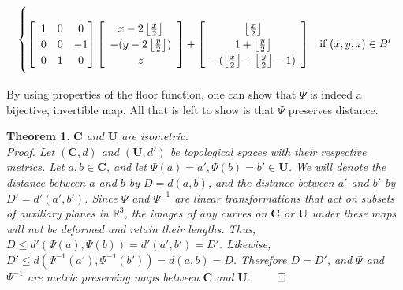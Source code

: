 \documentclass[]{article}
\newtheorem{thm}{Theorem}[subsection]
\begin{document}
\begin{equation}
\begin{cases}
	\\
	
		\left[ \hspace{2mm} \begin{matrix}
			1 & 0 & 0 \\
			0 & 0 & -1 \\
			0 & 1 & 0
		\end{matrix}\hspace{0mm}\right]
	
		\left[\begin{array}{c}
		x - 2\left\lfloor \frac{x}{2} \right\rfloor
		\\ -(y- 2\left\lfloor \frac{y}{2} \right\rfloor)
		\\ z
		\end{array} \right]
		+
		\left[\begin{array}{c}
			\left\lfloor \frac{x}{2} \right\rfloor
			\\1+ \left\lfloor \frac{y}{2} \right\rfloor
			\\ -(\left\lfloor \frac{x}{2} \right\rfloor + \left\lfloor \frac{y}{2} \right\rfloor -1)
		\end{array} \right]
			& \text{if } (x,y,z)\in B'	\vspace{2mm}
			
	\end{cases}
\end{equation}

By using properties of the floor function, one can show that $\Psi$ is indeed a bijective, invertible map. All that is left to show is that $\Psi$ preserves distance.

\begin{thm}{$\mathbf{C}$ and $\mathbf{U}$ are isometric.}\\
Proof. Let $(\mathbf{C}, d)$ and $(\mathbf{U}, d')$ be topological spaces with their respective metrics. Let $a,b\in\mathbf{C}$, and let $\Psi(a)=a',\Psi(b)=b'\in\mathbf{U}$. We will denote the distance between $a$ and $b$ by $D=d(a,b)$, and the distance between $a'$ and $b'$ by $D'=d'(a',b')$. Since $\Psi$ and $\Psi^{-1}$ are linear transformations that act on subsets of auxiliary planes in $\mathbb{R}^{3}$, the images of any curves on $\mathbf{C}$ or $\mathbf{U}$ under these maps will not be deformed and retain their lengths. Thus, $D \leq d'(\Psi(a), \Psi(b)) = d'(a',b') = D'$. Likewise, $D' \leq d(\Psi^{-1}(a'),\Psi^{-1}(b')) = d(a,b) = D$. Therefore $D=D'$, and $\Psi$ and $\Psi^{-1}$ are metric preserving maps between $\mathbf{C}$ and $\mathbf{U}$. $\qed$
\end{thm}
\end{document}
